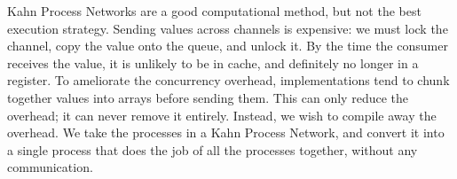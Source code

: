 % 
% 

Kahn Process Networks are a good computational method, but not the best execution strategy.
Sending values across channels is expensive: we must lock the channel, copy the value onto the queue, and unlock it.
By the time the consumer receives the value, it is unlikely to be in cache, and definitely no longer in a register.
To ameliorate the concurrency overhead, implementations tend to chunk together values into arrays before sending them.
This can only reduce the overhead; it can never remove it entirely.
Instead, we wish to compile away the overhead.
We take the processes in a Kahn Process Network, and convert it into a single process that does the job of all the processes together, without any communication.

% 
% 
% 



